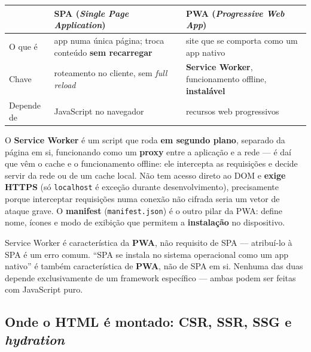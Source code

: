 \begin{conceito}
\begin{center}
\begin{tabular}{@{}p{2.6cm}p{4.6cm}p{4.6cm}@{}}
\toprule
& \textbf{SPA (\textit{Single Page Application})} & \textbf{PWA
(\textit{Progressive Web App})} \\
\midrule
O que é & app numa única página; troca conteúdo \textbf{sem recarregar} &
site que se comporta como um app nativo \\
Chave & roteamento no cliente, sem \textit{full reload} & \textbf{Service
Worker}, funcionamento offline, \textbf{instalável} \\
Depende de & JavaScript no navegador & recursos web progressivos \\
\bottomrule
\end{tabular}
\end{center}

O \textbf{Service Worker} é um script que roda \textbf{em segundo
plano}, separado da página em si, funcionando como um \textbf{proxy}
entre a aplicação e a rede --- é daí que vêm o cache e o funcionamento
offline: ele intercepta as requisições e decide servir da rede ou de um
cache local. Não tem acesso direto ao DOM e \textbf{exige HTTPS} (só
\texttt{localhost} é exceção durante desenvolvimento), precisamente
porque interceptar requisições numa conexão não cifrada seria um vetor
de ataque grave. O \textbf{manifest} (\texttt{manifest.json}) é o outro
pilar da PWA: define nome, ícones e modo de exibição que permitem a
\textbf{instalação} no dispositivo.
\end{conceito}

\begin{cuidado}
Service Worker é característica da \textbf{PWA}, não requisito de SPA
--- atribuí-lo à SPA é um erro comum. “SPA se instala no sistema
operacional como um app nativo” é também característica de \textbf{PWA},
não de SPA em si. Nenhuma das duas depende exclusivamente de um
framework específico --- ambas podem ser feitas com JavaScript puro.
\end{cuidado}

\subsection{Onde o HTML é montado: CSR, SSR, SSG e \textit{hydration}}

